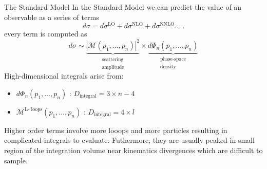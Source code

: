 \documentclass[t,handout,professionalfont,serif]{beamer}
\begin{document}
\begin{frame}{The Standard Model}
	\scriptsize
	In the Standard Model we can predict the value of an observable as a series of terms
	\begin{equation}
		d\sigma = d\sigma^{\text{LO}} + d\sigma^{\text{NLO}} + d\sigma^{\text{NNLO}} \dots  \ .
	\end{equation}
every term is computed as
\begin{equation}
	d\sigma \sim \underbrace{|\mathcal{M}(p_1,\dots, p_n)|^2}_{\substack{\text{scattering} \\ \text{amplitude}}} \times \underbrace{d\Phi_n(p_1,\dots, p_n)}_{\substack{\text{phase-space}\\ \text{density}}}  
\end{equation}
High-dimensional integrals arise from:
\begin{itemize}
	\item  $d\Phi_n(p_1,\dots, p_n) $  :  $D_\text{integral} = 3 \times n - 4$ 
	\item $\mathcal{M}^{\text{L- loops}}(p_1,\dots, p_n)$ :  $D_\text{integral} = 4 \times l$ 
\end{itemize}
\vspace{0.5cm}

Higher order terms involve more looops and more particles resulting in complicated integrals to evaluate. Futhermore, they are usually peaked in small region of the integration volume near kinematics divergences which are difficult to sample.
\end{frame}
\end{document}
